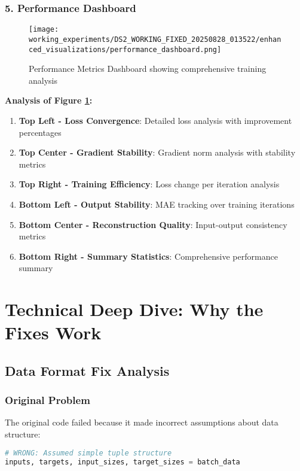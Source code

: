 \documentclass[11pt,a4paper]{article}
\begin{document}
\subsubsection{5. Performance Dashboard}
\begin{figure}[H]
\centering
\texttt{[image: working\_experiments/DS2\_WORKING\_FIXED\_20250828\_013522/enhanced\_visualizations/performance\_dashboard.png]}
\caption{Performance Metrics Dashboard showing comprehensive training analysis}
\label{fig:dashboard}
\end{figure}

\textbf{Analysis of Figure \ref{fig:dashboard}:}
\begin{enumerate}
    \item \textbf{Top Left - Loss Convergence}: Detailed loss analysis with improvement percentages
    \item \textbf{Top Center - Gradient Stability}: Gradient norm analysis with stability metrics
    \item \textbf{Top Right - Training Efficiency}: Loss change per iteration analysis
    \item \textbf{Bottom Left - Output Stability}: MAE tracking over training iterations
    \item \textbf{Bottom Center - Reconstruction Quality}: Input-output consistency metrics
    \item \textbf{Bottom Right - Summary Statistics}: Comprehensive performance summary
\end{enumerate}

\section{Technical Deep Dive: Why the Fixes Work}

\subsection{Data Format Fix Analysis}

\subsubsection{Original Problem}
The original code failed because it made incorrect assumptions about data structure:

\begin{lstlisting}[language=Python, caption=Original Broken Assumption]
# WRONG: Assumed simple tuple structure
inputs, targets, input_sizes, target_sizes = batch_data
\end{lstlisting}
\end{document}
